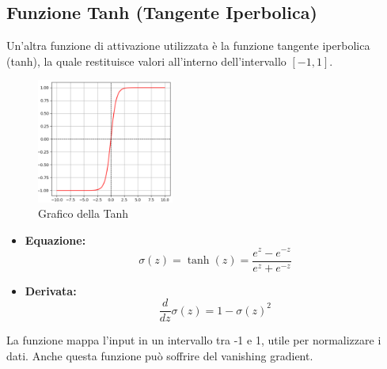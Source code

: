 \subsection{Funzione Tanh (Tangente Iperbolica)}
Un’altra funzione di attivazione utilizzata è la funzione 
tangente iperbolica (tanh), la quale restituisce 
valori all’interno dell’intervallo $[-1, 1]$.
\begin{multicols}{2}
    {
        \begin{figure}[H]
            \centering
            \includegraphics[width=0.40\textwidth]{Immagini/Grafici/graficoTanh.png}
            \caption{Grafico della Tanh}
        \end{figure}
    }
    {
        \begin{itemize}
            \item \textbf{Equazione:}
            \begin{equation}
                \sigma(z) = \tanh(z) = \frac{e^z - e^{-z}}{e^z + e^{-z}}
            \end{equation}
                
            \item \textbf{Derivata:}
            \begin{equation}
                \frac{d}{dz}\sigma(z)  = 1 - \sigma(z)^2
            \end{equation}
        \end{itemize}

        La funzione mappa l'input in un intervallo tra -1 e 1, 
        utile per normalizzare i dati. Anche questa funzione può 
        soffrire del vanishing gradient.
    }
\end{multicols}





